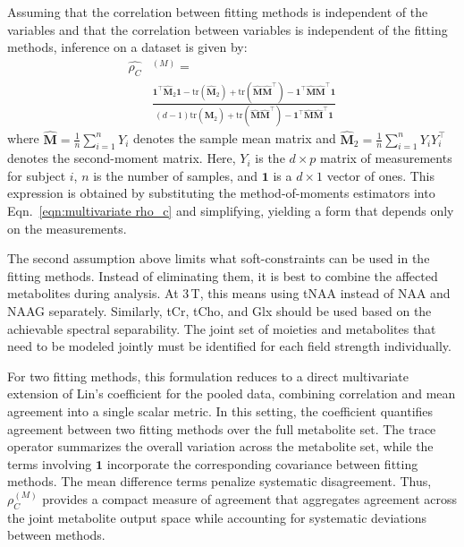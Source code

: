 Assuming that the correlation between fitting methods is independent of the variables and that the correlation between variables is independent of the fitting methods, inference on a dataset is given by:
\begin{equation}\label{eqn:cccm_estimator}
\begin{aligned}
    \widehat{\rho_C}&^{(M)} = \\
        &\frac{
            \mathbf{1}^\top \widehat{\mathbf{M}}_2 \mathbf{1} - \mathrm{tr}\left(\widehat{\mathbf{M}}_2\right)
            + \mathrm{tr}\left(\widehat{\mathbf{M}}\widehat{\mathbf{M}}^\top\right)
            - \mathbf{1}^\top \widehat{\mathbf{M}}\widehat{\mathbf{M}}^\top \mathbf{1}
        }{
            (d-1)\mathrm{tr}\left(\widehat{\mathbf{M}}_2\right)
            + \mathrm{tr}\left(\widehat{\mathbf{M}}\widehat{\mathbf{M}}^\top\right)
            - \mathbf{1}^\top \widehat{\mathbf{M}}\widehat{\mathbf{M}}^\top \mathbf{1}
        }
\end{aligned}
\end{equation}
\noindent where $\hat{\mathbf{M}} = \frac{1}{n}\sum_{i=1}^n Y_i$ denotes the sample mean matrix and $\hat{\mathbf{M}}_2 = \frac{1}{n}\sum_{i=1}^n Y_i Y_i^\top$ denotes the second-moment matrix. Here, $Y_i$ is the $d \times p$ matrix of measurements for subject $i$, $n$ is the number of samples, and $\mathbf{1}$ is a $d \times 1$ vector of ones. This expression is obtained by substituting the method-of-moments estimators into Eqn.~\ref{eqn:multivariate rho_c} and simplifying, yielding a form that depends only on the measurements. 

The second assumption above limits what soft-constraints can be used in the fitting methods. Instead of eliminating them, it is best to combine the affected metabolites during analysis. At 3\,T, this means using tNAA instead of NAA and NAAG separately. Similarly, tCr, tCho, and Glx should be used based on the achievable spectral separability. The joint set of moieties and metabolites that need to be modeled jointly must be identified for each field strength individually.

For two fitting methods, this formulation reduces to a direct multivariate extension of Lin's coefficient for the pooled data, combining correlation and mean agreement into a single scalar metric. In this setting, the coefficient quantifies agreement between two fitting methods over the full metabolite set. The trace operator summarizes the overall variation across the metabolite set, while the terms involving $\mathbf{1}$ incorporate the corresponding covariance between fitting methods. The mean difference terms penalize systematic disagreement. Thus, $\rho_C^{(M)}$ provides a compact measure of agreement that aggregates agreement across the joint metabolite output space while accounting for systematic deviations between methods.

